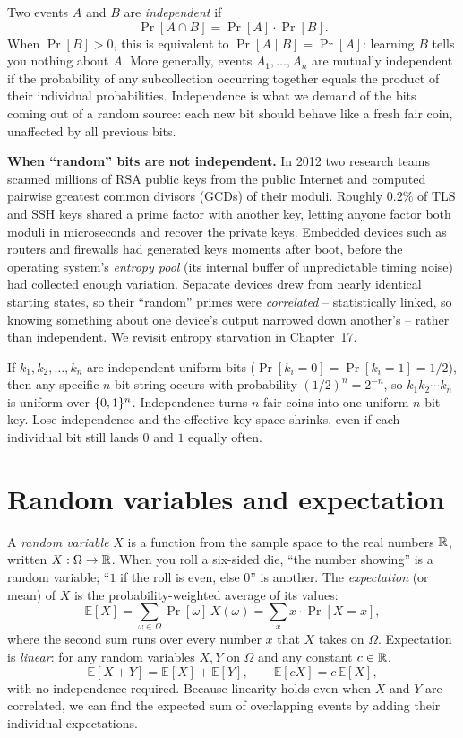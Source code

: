 Two events $A$ and $B$ are \emph{independent} if
\[
  \Pr[A \cap B] = \Pr[A]\cdot \Pr[B].
\]
When $\Pr[B] > 0$, this is equivalent to $\Pr[A \mid B] = \Pr[A]$: learning $B$ tells you nothing about $A$. More generally, events $A_1, \dots, A_n$ are mutually independent if the probability of any subcollection occurring together equals the product of their individual probabilities. Independence is what we demand of the bits coming out of a random source: each new bit should behave like a fresh fair coin, unaffected by all previous bits.

\begin{attackbox}
\textbf{When ``random'' bits are not independent.} In 2012 two research teams scanned millions of RSA public keys from the public Internet and computed pairwise greatest common divisors (GCDs) of their moduli. Roughly $0.2\%$ of TLS and SSH keys shared a prime factor with another key, letting anyone factor both moduli in microseconds and recover the private keys. Embedded devices such as routers and firewalls had generated keys moments after boot, before the operating system's \emph{entropy pool} (its internal buffer of unpredictable timing noise) had collected enough variation. Separate devices drew from nearly identical starting states, so their ``random'' primes were \emph{correlated} -- statistically linked, so knowing something about one device's output narrowed down another's -- rather than independent. We revisit entropy starvation in Chapter~17.
\end{attackbox}

If $k_1, k_2, \dots, k_n$ are independent uniform bits ($\Pr[k_i = 0] = \Pr[k_i = 1] = 1/2$), then any specific $n$-bit string occurs with probability $(1/2)^n = 2^{-n}$, so $k_1 k_2 \cdots k_n$ is uniform over $\{0,1\}^n$. Independence turns $n$ fair coins into one uniform $n$-bit key. Lose independence and the effective key space shrinks, even if each individual bit still lands $0$ and $1$ equally often.

\section{Random variables and expectation}

A \emph{random variable} $X$ is a function from the sample space to the real numbers $\mathbb{R}$, written $X : \Omega \to \mathbb{R}$. When you roll a six-sided die, ``the number showing'' is a random variable; ``$1$ if the roll is even, else $0$'' is another. The \emph{expectation} (or mean) of $X$ is the probability-weighted average of its values:
\[
  \mathbb{E}[X] = \sum_{\omega \in \Omega} \Pr[\omega]\, X(\omega) = \sum_{x} x \cdot \Pr[X = x],
\]
where the second sum runs over every number $x$ that $X$ takes on $\Omega$. Expectation is \emph{linear}: for any random variables $X, Y$ on $\Omega$ and any constant $c \in \mathbb{R}$,
\[
  \mathbb{E}[X + Y] = \mathbb{E}[X] + \mathbb{E}[Y], \qquad \mathbb{E}[cX] = c\,\mathbb{E}[X],
\]
with no independence required. Because linearity holds even when $X$ and $Y$ are correlated, we can find the expected sum of overlapping events by adding their individual expectations.

